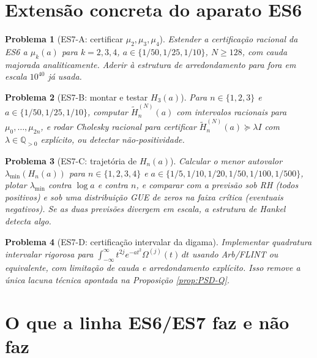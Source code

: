\documentclass[12pt,a4paper]{article}
\newtheorem{problema}{Problema}
\begin{document}
\section{Extensão concreta do aparato ES6}

\begin{problema}[ES7-A: certificar $\mu_2, \mu_3, \mu_4$]\label{prob:mu234}
Estender a certificação racional da ES6 a $\mu_k(a)$ para
$k=2,3,4$, $a\in\{1/50, 1/25, 1/10\}$, $N\ge 128$, com cauda
majorada analiticamente. Aderir à estrutura de arredondamento para
fora em escala $10^{40}$ já usada.
\end{problema}

\begin{problema}[ES7-B: montar e testar $H_3(a)$]\label{prob:H3}
Para $n\in\{1,2,3\}$ e $a\in\{1/50, 1/25, 1/10\}$, computar
$\widetilde H_n^{(N)}(a)$ com intervalos racionais para $\mu_0,\dots,\mu_{2n}$,
e rodar Cholesky racional para certificar $\widetilde H_n^{(N)}(a)\succeq \lambda I$
com $\lambda\in\mathbb{Q}_{>0}$ explícito, ou detectar não-positividade.
\end{problema}

\begin{problema}[ES7-C: trajetória de $H_n(a)$]\label{prob:traj}
Calcular o menor autovalor $\lambda_{\min}(H_n(a))$ para
$n\in\{1,2,3,4\}$ e $a\in\{1/5, 1/10, 1/20, 1/50, 1/100, 1/500\}$,
plotar $\lambda_{\min}$ contra $\log a$ e contra $n$, e comparar
com a previsão sob RH (todos positivos) e sob uma distribuição
GUE de zeros na faixa crítica (eventuais negativos). Se as duas
previsões divergem em escala, a estrutura de Hankel detecta algo.
\end{problema}

\begin{problema}[ES7-D: certificação intervalar da digama]\label{prob:digamma}
Implementar quadratura intervalar rigorosa para
$\int_{-\infty}^{\infty} t^{2j} e^{-at^2}\Omega^{(j)}(t)\,dt$
usando Arb/FLINT ou equivalente, com limitação de cauda e
arredondamento explícito. Isso remove a única lacuna técnica apontada
na Proposição \ref{prop:PSD-Q}.
\end{problema}

\section{O que a linha ES6/ES7 faz e não faz}
\end{document}

